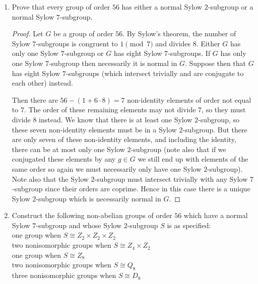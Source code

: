 \documentclass[11pt]{article}
\begin{document}
\begin{enumerate}
\begin{enumerate}[label=\textbf{(\alph*)}]
\begin{proof}
\begin{align*}
            Z_4 \times Z_2 &\times Z_7\\
            Z_8 &\times Z_7.
          \end{align*}
          These are the only three abelian groups of order $56$ up to isomorphism.
        \end{proof}
        \item Prove that every group of order $56$ has either a normal Sylow $2$-subgroup or a normal Sylow $7$-subgroup.
        \begin{proof}
          Let $G$ be a group of order $56$. By Sylow's theorem, the number of Sylow $7$-subgroups is congruent to $1 \pmod{7}$ and divides $8$. Either $G$ has only one Sylow $7$-subgroup or $G$ has eight Sylow $7$-subgroups. If $G$ has only one Sylow $7$-subgroup then necessarily it is normal in $G$. Suppose then that $G$ has eight Sylow $7$-subgroups (which intersect trivially and are conjugate to each other) instead. 

          Then there are $56- (1 + 6\cdot 8) = 7$ non-identity elements of order not equal to $7$. The order of these remaining elements may not divide $7$, so they must divide $8$ instead. We know that there is at least one Sylow $2$-subgroup, so these seven non-identity elements must be in a Sylow $2$-subgroup. But there are only seven of these non-identity elements, and including the identity, there can be at most only one Sylow $2$-subgroup (note also that if we conjugated these elements by any $g\in G$ we still end up with elements of the same order so again we must necessarily only have one Sylow $2$-subgroup). Note also that the Sylow $2$-subgroup must intersect trivially with any Sylow $7$-subgroup since their orders are coprime. Hence in this case there is a unique Sylow $2$-subgroup which is necessarily normal in $G$.
        \end{proof}
        \item Construct the following non-abelian groups of order $56$ which have a normal Sylow $7$-subgroup and whose Sylow $2$-subgroup $S$ is as specified:\\ 
        \hspace*{1cm} one group when $S\cong Z_2\times Z_2\times Z_2$\\
        \hspace*{1cm} two nonisomorphic groups when $S\cong Z_4\times Z_2$\\
        \hspace*{1cm} one group when $S\cong Z_8$\\
        \hspace*{1cm} two nonisomorphic groups when $S\cong Q_8$\\
        \hspace*{1cm} three nonisomorphic groups when $S\cong D_8$


\end{enumerate}
\end{enumerate}
\end{document}
